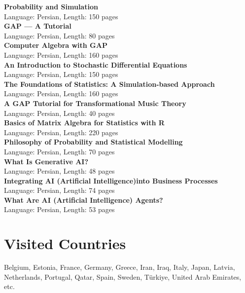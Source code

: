 \documentclass[a4paper,10pt]{article}
\begin{document}
\textbf{Probability and Simulation}\\
Language: Persian, Length: 150 pages\\

\textbf{GAP — A Tutorial}\\
Language: Persian, Length: 80 pages\\

\textbf{Computer Algebra with GAP}\\
Language: Persian, Length: 160 pages\\

\textbf{An Introduction to Stochastic Differential Equations}\\
Language: Persian, Length: 150 pages\\

\textbf{The Foundations of Statistics: A Simulation-based Approach}\\
Language: Persian, Length: 160 pages\\

\textbf{A GAP Tutorial for Transformational Music Theory}\\
Language: Persian, Length: 40 pages\\

\textbf{Basics of Matrix Algebra for Statistics with R}\\
Language: Persian, Length: 220 pages\\

\textbf{Philosophy of Probability and Statistical Modelling}\\
Language: Persian, Length: 70 pages\\

\textbf{What Is Generative AI?}\\
Language: Persian, Length: 48 pages\\

\textbf{Integrating AI (Artificial Intelligence)into Business Processes}\\
Language: Persian, Length: 74 pages\\

\textbf{What Are AI (Artificial Intelligence) Agents?}\\
Language: Persian, Length: 53 pages\\

\section{\textbf{Visited Countries}}

Belgium, Estonia, France, Germany, Greece, Iran, Iraq, Italy, Japan, Latvia, Netherlands, Portugal, Qatar, Spain, Sweden, Türkiye, United Arab Emirates, etc.
\end{document}
